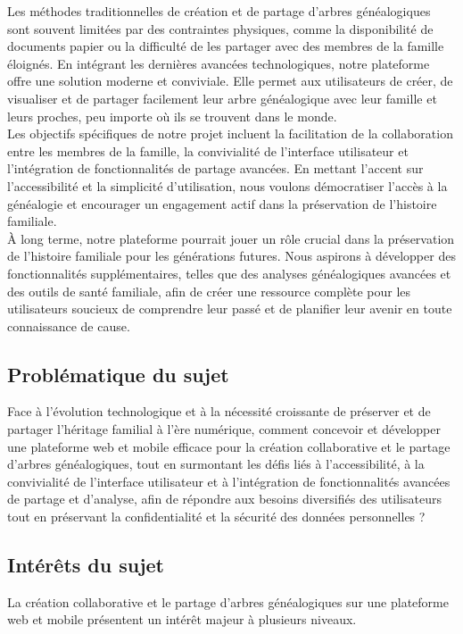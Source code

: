 Les méthodes traditionnelles de création et de partage d’arbres généalogiques
sont souvent limitées par des contraintes physiques, comme la disponibilité de
documents papier ou la difficulté de les partager avec des membres de la famille
éloignés. En intégrant les dernières avancées technologiques, notre plateforme
offre une solution moderne et conviviale. Elle permet aux utilisateurs de créer,
de visualiser et de partager facilement leur arbre généalogique avec leur famille
et leurs proches, peu importe où ils se trouvent dans le monde. \\

Les objectifs spécifiques de notre projet incluent la facilitation de la collaboration
entre les membres de la famille, la convivialité de l’interface utilisateur et
l’intégration de fonctionnalités de partage avancées. En mettant l’accent sur
l’accessibilité et la simplicité d’utilisation, nous voulons démocratiser l’accès
à la généalogie et encourager un engagement actif dans la préservation de l’histoire familiale. \\

À long terme, notre plateforme pourrait jouer un rôle crucial dans la préservation
de l'histoire familiale pour les générations futures. Nous aspirons à développer
des fonctionnalités supplémentaires, telles que des analyses généalogiques avancées
et des outils de santé familiale, afin de créer une ressource complète pour les
utilisateurs soucieux de comprendre leur passé et de planifier leur avenir en
toute connaissance de cause. \\

\subsection{Problématique du sujet}
Face à l'évolution technologique et à la nécessité croissante de préserver et
de partager l'héritage familial à l'ère numérique, comment concevoir et développer
une plateforme web et mobile efficace pour la création collaborative et le partage
d'arbres généalogiques, tout en surmontant les défis liés à l'accessibilité, à la
convivialité de l'interface utilisateur et à l'intégration de fonctionnalités
avancées de partage et d'analyse, afin de répondre aux besoins diversifiés des
utilisateurs tout en préservant la confidentialité et la sécurité des données personnelles ? \\

\subsection{Intérêts du sujet}
La création collaborative et le partage d’arbres généalogiques sur une plateforme
web et mobile présentent un intérêt majeur à plusieurs niveaux. \\

